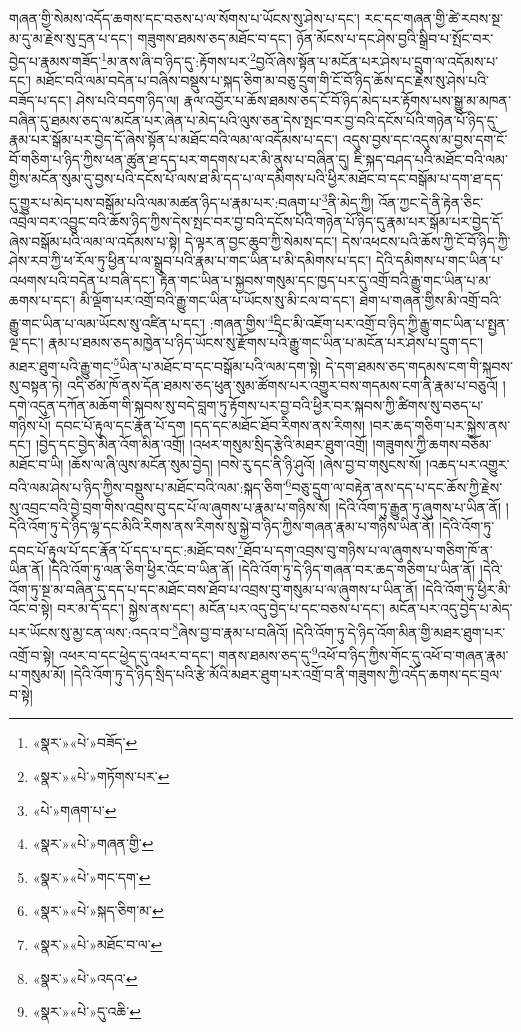 གཞན་གྱི་སེམས་འདོད་ཆགས་དང་བཅས་པ་ལ་སོགས་པ་ཡོངས་སུ་ཤེས་པ་དང་། རང་དང་གཞན་གྱི་ཚེ་རབས་སྔ་མ་དུ་མ་རྗེས་སུ་དྲན་པ་དང་། གཟུགས་ཐམས་ཅད་མཐོང་བ་དང་། ཉོན་མོངས་པ་དང་ཤེས་བྱའི་སྒྲིབ་པ་སྤོང་བར་བྱེད་པ་རྣམས་གཟོད་\footnote{«སྣར་»«པེ་»བཟོད་}མ་ནས་ཞི་བ་ཉིད་དུ་:རྟོགས་པར་\footnote{«སྣར་»«པེ་»གཏོགས་པར་}བྱའོ་ཞེས་སྟོན་པ་མངོན་པར་ཤེས་པ་དྲུག་ལ་འདོམས་པ་དང་། མཐོང་བའི་ལམ་བདེན་པ་བཞིས་བསྡུས་པ་སྐད་ཅིག་མ་བཅུ་དྲུག་གི་ངོ་བོ་ཉིད་ཆོས་དང་རྗེས་སུ་ཤེས་པའི་བཟོད་པ་དང་། ཤེས་པའི་བདག་ཉིད་ལ། རྣལ་འབྱོར་པ་ཆོས་ཐམས་ཅད་ངོ་བོ་ཉིད་མེད་པར་རྟོགས་པས་སྒྱུ་མ་མཁན་བཞིན་དུ་ཐམས་ཅད་ལ་མངོན་པར་ཞེན་པ་མེད་པའི་ལུས་ཅན་དེས་སྤང་བར་བྱ་བའི་དངོས་པོའི་གཉེན་པོ་ཉིད་དུ་རྣམ་པར་སྒོམ་པར་བྱེད་དོ་ཞེས་སྟོན་པ་མཐོང་བའི་ལམ་ལ་འདོམས་པ་དང་། འདུས་བྱས་དང་འདུས་མ་བྱས་དག་ངོ་བོ་གཅིག་པ་ཉིད་ཀྱིས་ཕན་ཚུན་ཐ་དད་པར་གདགས་པར་མི་ནུས་པ་བཞིན་དུ། ཇི་སྐད་བཤད་པའི་མཐོང་བའི་ལམ་གྱིས་མངོན་སུམ་དུ་བྱས་པའི་དངོས་པོ་ལས་ཐ་མི་དད་པ་ལ་དམིགས་པའི་ཕྱིར་མཐོང་བ་དང་བསྒོམ་པ་དག་ཐ་དད་དུ་གྱུར་པ་མེད་པས་བསྒོམ་པའི་ལམ་མཚན་ཉིད་པ་རྣམ་པར་:བཞག་པ་\footnote{«པེ་»གཞག་པ་}ནི་མེད་ཀྱི། འོན་ཀྱང་དེ་ནི་རྟེན་ཅིང་འབྲེལ་བར་འབྱུང་བའི་ཆོས་ཉིད་ཀྱིས་དེས་སྤང་བར་བྱ་བའི་དངོས་པོའི་གཉེན་པོ་ཉིད་དུ་རྣམ་པར་སྒོམ་པར་བྱེད་དོ་ཞེས་བསྒོམ་པའི་ལམ་ལ་འདོམས་པ་སྟེ། དེ་ལྟར་ན་བྱང་ཆུབ་ཀྱི་སེམས་དང་། དེས་འཕངས་པའི་ཆོས་ཀྱི་ངོ་བོ་ཉིད་ཀྱི་ཤེས་རབ་ཀྱི་ཕ་རོལ་ཏུ་ཕྱིན་པ་ལ་སྒྲུབ་པའི་རྣམ་པ་གང་ཡིན་པ་མི་དམིགས་པ་དང་། དེའི་དམིགས་པ་གང་ཡིན་པ་འཕགས་པའི་བདེན་པ་བཞི་དང་། རྟེན་གང་ཡིན་པ་སྐྱབས་གསུམ་དང་ཁྱད་པར་དུ་འགྲོ་བའི་རྒྱུ་གང་ཡིན་པ་མ་ཆགས་པ་དང་། མི་ལྡོག་པར་འགྲོ་བའི་རྒྱུ་གང་ཡིན་པ་ཡོངས་སུ་མི་ངལ་བ་དང་། ཐེག་པ་གཞན་གྱིས་མི་འགྲོ་བའི་རྒྱུ་གང་ཡིན་པ་ལམ་ཡོངས་སུ་འཛིན་པ་དང་། :གཞན་གྱིས་\footnote{«སྣར་»«པེ་»གཞན་གྱི་}དྲིང་མི་འཇོག་པར་འགྲོ་བ་ཉིད་ཀྱི་རྒྱུ་གང་ཡིན་པ་སྤྱན་ལྔ་དང་། རྣམ་པ་ཐམས་ཅད་མཁྱེན་པ་ཉིད་ཡོངས་སུ་རྫོགས་པའི་རྒྱུ་གང་ཡིན་པ་མངོན་པར་ཤེས་པ་དྲུག་དང་། མཐར་ཐུག་པའི་རྒྱུ་གང་\footnote{«སྣར་»«པེ་»གང་དག་}ཡིན་པ་མཐོང་བ་དང་བསྒོམ་པའི་ལམ་དག་སྟེ། དེ་དག་ཐམས་ཅད་གདམས་ངག་གི་སྐབས་སུ་བསྟན་ཏེ། འདི་ཙམ་ཁོ་ནས་དོན་ཐམས་ཅད་ཕུན་སུམ་ཚོགས་པར་འགྱུར་བས་གདམས་ངག་ནི་རྣམ་པ་བཅུའོ། །དགེ་འདུན་དཀོན་མཆོག་གི་སྐབས་སུ་བདེ་བླག་ཏུ་རྟོགས་པར་བྱ་བའི་ཕྱིར་བར་སྐབས་ཀྱི་ཚིགས་སུ་བཅད་པ་གཉིས་པོ། དབང་པོ་རྟུལ་དང་རྣོན་པོ་དག །དད་དང་མཐོང་ཐོབ་རིགས་ནས་རིགས། །བར་ཆད་གཅིག་པར་སྐྱེས་ནས་དང་། །བྱེད་དང་བྱེད་མིན་འོག་མིན་འགྲོ། །འཕར་གསུམ་སྲིད་རྩེའི་མཐར་ཐུག་འགྲོ། །གཟུགས་ཀྱི་ཆགས་བཅོམ་མཐོང་བ་ཡི། །ཆོས་ལ་ཞི་ལུས་མངོན་སུམ་བྱེད། །བསེ་རུ་དང་ནི་ཉི་ཤུའོ། །ཞེས་བྱ་བ་གསུངས་སོ། །འཆད་པར་འགྱུར་བའི་ལམ་ཤེས་པ་ཉིད་ཀྱིས་བསྡུས་པ་མཐོང་བའི་ལམ་:སྐད་ཅིག་\footnote{«སྣར་»«པེ་»སྐད་ཅིག་མ་}བཅུ་དྲུག་ལ་བརྟེན་ནས་དད་པ་དང་ཆོས་ཀྱི་རྗེས་སུ་འབྲང་བའི་བྱེ་བྲག་གིས་འབྲས་བུ་དང་པོ་ལ་ཞུགས་པ་རྣམ་པ་གཉིས་སོ། །དེའི་འོག་ཏུ་རྒྱུན་ཏུ་ཞུགས་པ་ཡིན་ནོ། །དེའི་འོག་ཏུ་དེ་ཉིད་ལྷ་དང་མིའི་རིགས་ནས་རིགས་སུ་སྐྱེ་བ་ཉིད་ཀྱིས་གཞན་རྣམ་པ་གཉིས་ཡིན་ནོ། །དེའི་འོག་ཏུ་དབང་པོ་རྟུལ་པོ་དང་རྣོན་པོ་དད་པ་དང་:མཐོང་བས་\footnote{«སྣར་»«པེ་»མཐོང་བ་ལ་}ཐོབ་པ་དག་འབྲས་བུ་གཉིས་པ་ལ་ཞུགས་པ་གཅིག་ཁོ་ན་ཡིན་ནོ། །དེའི་འོག་ཏུ་ལན་ཅིག་ཕྱིར་འོང་བ་ཡིན་ནོ། །དེའི་འོག་ཏུ་དེ་ཉིད་གཞན་བར་ཆད་གཅིག་པ་ཡིན་ནོ། །དེའི་འོག་ཏུ་སྔ་མ་བཞིན་དུ་དད་པ་དང་མཐོང་བས་ཐོབ་པ་འབྲས་བུ་གསུམ་པ་ལ་ཞུགས་པ་ཡིན་ནོ། །དེའི་འོག་ཏུ་ཕྱིར་མི་འོང་བ་སྟེ། བར་མ་དོ་དང་། སྐྱེས་ནས་དང་། མངོན་པར་འདུ་བྱེད་པ་དང་བཅས་པ་དང་། མངོན་པར་འདུ་བྱེད་པ་མེད་པར་ཡོངས་སུ་མྱ་ངན་ལས་:འདའ་བ་\footnote{«སྣར་»«པེ་»འདའ་}ཞེས་བྱ་བ་རྣམ་པ་བཞིའོ། །དེའི་འོག་ཏུ་དེ་ཉིད་འོག་མིན་གྱི་མཐར་ཐུག་པར་འགྲོ་བ་སྟེ། འཕར་བ་དང་ཕྱེད་དུ་འཕར་བ་དང་། གནས་ཐམས་ཅད་དུ་\footnote{«སྣར་»«པེ་»དུ་འཆི་}འཕོ་བ་ཉིད་ཀྱིས་གོང་དུ་འཕོ་བ་གཞན་རྣམ་པ་གསུམ་མོ། །དེའི་འོག་ཏུ་དེ་ཉིད་སྲིད་པའི་རྩེ་མོའི་མཐར་ཐུག་པར་འགྲོ་བ་ནི་གཟུགས་ཀྱི་འདོད་ཆགས་དང་བྲལ་བ་སྟེ། 